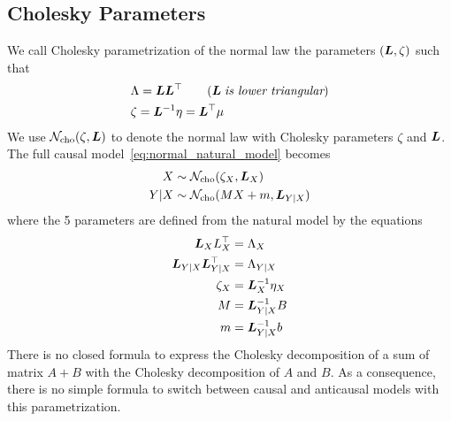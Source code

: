 \begin{subappendices}
\subsection{Cholesky Parameters}


We call Cholesky parametrization of the normal law the parameters $({\bm{L}},\zeta)$ such that 
\begin{align*}
     &\Lambda = {\bm{L}} {\bm{L}}^\top \quad \quad ({\bm{L}} \; \textit{is lower triangular})\\
    &\zeta = {\bm{L}}^{-1} \eta = {\bm{L}}^\top \mu
\end{align*}
We use ${\mathcal N}_\text{cho}(\zeta, {\bm{L}})$ to denote the normal law with Cholesky parameters $\zeta$ and ${\bm{L}}$.
The full causal model~\eqref{eq:normal_natural_model} becomes
\begin{align}
    X &\sim {\mathcal N}_\text{cho}(\zeta_X, {\bm{L}}_X) \nonumber\\
    Y|X &\sim {\mathcal N}_\text{cho}(M X + m, {\bm{L}}_{Y|X})
\end{align}
where the 5 parameters are defined from the natural model by the equations
\begin{align}
    \label{eq:normal_cholesky_param}
    {\bm{L}}_X L_X^\top &= \Lambda_X \nonumber\\
    {\bm{L}}_{Y|X} {\bm{L}}_{Y|X}^\top &= \Lambda_{Y|X}\nonumber \\
    \zeta_X &= {\bm{L}}_X^{-1} \eta_X\\
    M &= {\bm{L}}_{Y|X}^{-1} B\nonumber\\
    m &= {\bm{L}}_{Y|X}^{-1} b\nonumber
\end{align}
There is no closed formula to express the Cholesky decomposition of a sum of matrix $A+B$ with the Cholesky decomposition of $A$ and $B$. 
As a consequence, there is no simple formula to switch between causal and anticausal models with this parametrization.


\end{subappendices}
